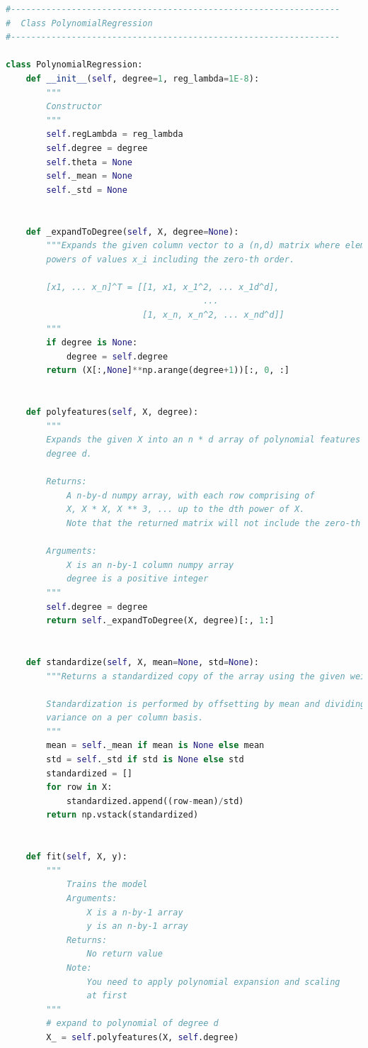 \documentclass{article}
\newcommand{\1}{\mathbf{1}}
\begin{document}
\begin{lstlisting}[language=Python]
#-----------------------------------------------------------------
#  Class PolynomialRegression
#-----------------------------------------------------------------

class PolynomialRegression:
    def __init__(self, degree=1, reg_lambda=1E-8):
        """
        Constructor
        """
        self.regLambda = reg_lambda
        self.degree = degree
        self.theta = None
        self._mean = None
        self._std = None


    def _expandToDegree(self, X, degree=None):
        """Expands the given column vector to a (n,d) matrix where elements are
        powers of values x_i including the zero-th order.

        [x1, ... x_n]^T = [[1, x1, x_1^2, ... x_1d^d],
                                       ...
                           [1, x_n, x_n^2, ... x_nd^d]]
        """
        if degree is None:
            degree = self.degree
        return (X[:,None]**np.arange(degree+1))[:, 0, :]


    def polyfeatures(self, X, degree):
        """
        Expands the given X into an n * d array of polynomial features of
        degree d.

        Returns:
            A n-by-d numpy array, with each row comprising of
            X, X * X, X ** 3, ... up to the dth power of X.
            Note that the returned matrix will not include the zero-th power.

        Arguments:
            X is an n-by-1 column numpy array
            degree is a positive integer
        """
        self.degree = degree
        return self._expandToDegree(X, degree)[:, 1:]


    def standardize(self, X, mean=None, std=None):
        """Returns a standardized copy of the array using the given weights.

        Standardization is performed by offsetting by mean and dividing by
        variance on a per column basis.
        """
        mean = self._mean if mean is None else mean
        std = self._std if std is None else std
        standardized = []
        for row in X:
            standardized.append((row-mean)/std)
        return np.vstack(standardized)


    def fit(self, X, y):
        """
            Trains the model
            Arguments:
                X is a n-by-1 array
                y is an n-by-1 array
            Returns:
                No return value
            Note:
                You need to apply polynomial expansion and scaling
                at first
        """
        # expand to polynomial of degree d
        X_ = self.polyfeatures(X, self.degree)


\end{lstlisting}
\end{document}
